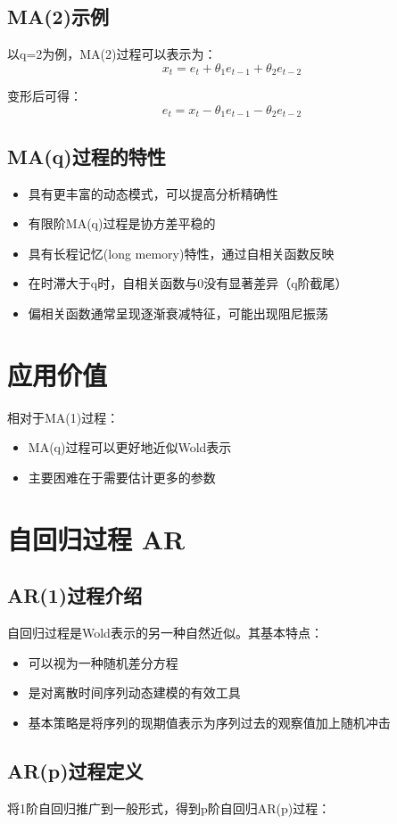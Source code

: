 \subsection{MA(2)示例}
以q=2为例，MA(2)过程可以表示为：
\[x_t = e_t + \theta_1e_{t-1} + \theta_2e_{t-2}\]

变形后可得：
\[e_t = x_t - \theta_1e_{t-1} - \theta_2e_{t-2}\]

\subsection{MA(q)过程的特性}
\begin{itemize}
\item 具有更丰富的动态模式，可以提高分析精确性
\item 有限阶MA(q)过程是协方差平稳的
\item 具有长程记忆(long memory)特性，通过自相关函数反映
\item 在时滞大于q时，自相关函数与0没有显著差异（q阶截尾）
\item 偏相关函数通常呈现逐渐衰减特征，可能出现阻尼振荡
\end{itemize}


\section{应用价值}
相对于MA(1)过程：
\begin{itemize}
    \item MA(q)过程可以更好地近似Wold表示
    \item 主要困难在于需要估计更多的参数
\end{itemize}


\section{自回归过程 AR}
\subsection{AR(1)过程介绍}
自回归过程是Wold表示的另一种自然近似。其基本特点：
\begin{itemize}
    \item 可以视为一种随机差分方程
    \item 是对离散时间序列动态建模的有效工具
    \item 基本策略是将序列的现期值表示为序列过去的观察值加上随机冲击
\end{itemize}

\subsection{AR(p)过程定义}
将1阶自回归推广到一般形式，得到p阶自回归AR(p)过程：

